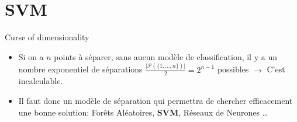 \documentclass[8pt]{beamer}
\begin{document}
	\section[SVM]{SVM}
	\begin{frame}{Curse of dimensionality}
		\begin{itemize}
			\item <1-> Si on a $n$ points à séparer, sans aucun modèle de classification, il y a un nombre exponentiel de séparations $ \frac{\vert \mathscr{P}(\{1,\dots,n\}) \vert}{2} = 2^{n-1}$ possibles $\longrightarrow$ C'est incalculable.
			\item <2-> Il faut donc un modèle de séparation qui permettra de chercher efficacement une bonne solution: Forêts Aléatoires, \textbf{SVM}, Réseaux de Neurones \dots
		\end{itemize}
	\end{frame}
\end{document}

